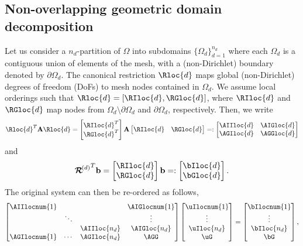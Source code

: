 \documentclass{article}
\begin{document}
\subsection{Non-overlapping geometric domain decomposition}
Let us consider a $n_d$-partition of $\Omega$ into subdomains $\{\Omega_d\}_{d=1}^{n_d}$ where each $\Omega_d$ is a contiguous union of elements of the mesh, with a (non-Dirichlet) boundary denoted by $\partial\Omega_d$.
The canonical restriction $\Rloc{d}$ maps global (non-Dirichlet) degrees of freedom (DoFs) to mesh nodes contained in $\Omega_d$.
We assume local orderings such that $\Rloc{d}=[\RIloc{d},\RGloc{d}]$,
where $\RIloc{d}$ and $\RGloc{d}$ map nodes from $\Omega_d\setminus\partial\Omega_d$ and $\partial\Omega_d$, respectively.
Then, we write
\begin{align}\label{eq:010}
\Rloc{d}^T\mathbf{A}\Rloc{d}=
\begin{bmatrix}
\RIloc{d}^T\\
\RGloc{d}^T
\end{bmatrix}
\mathbf{A}
\begin{bmatrix}
\RIloc{d}&\RGloc{d}
\end{bmatrix}=:
\begin{bmatrix}
\AIIloc{d}&\AIGloc{d}\\
\AGIloc{d}&\AGGloc{d}
\end{bmatrix}
\end{align}
and
\begin{align}\label{eq:015}
{\boldsymbol{\mathcal{R}}^{\!(d)}}^T\mathbf{b}=
\begin{bmatrix}
\RIloc{d}\\
\RGloc{d}
\end{bmatrix}
\mathbf{b}=:
\begin{bmatrix}
\bIloc{d}\\
\bGloc{d}
\end{bmatrix}.
\end{align}
The original system can then be re-ordered as follows,
\begin{align}\label{eq:020}
\begin{bmatrix}
\AIIlocnum{1}&      &            &\AIGlocnum{1}\\
             &\ddots&            &\vdots       \\
             &      &\AIIloc{n_d}&\AIGloc{n_d} \\
\AGIlocnum{1}&\cdots&\AGIloc{n_d}&\AGG
\end{bmatrix}
\begin{bmatrix}
\uIlocnum{1}\\
\vdots      \\
\uIloc{n_d} \\
\uG
\end{bmatrix}
=
\begin{bmatrix}
\bIlocnum{1}\\
\vdots      \\
\bIloc{n_d} \\
\bG
\end{bmatrix},
\end{align}
\end{document}
